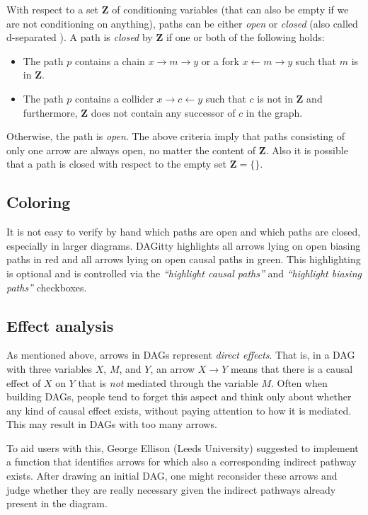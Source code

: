 \documentclass[a4paper]{article} %
\newcommand{\pp}{{\sc DAG}itty\xspace}
\newcommand{\action}[1]{\emph{``#1''}}
\begin{document}
With respect to a set $\mathbf{Z}$ of conditioning variables (that 
can also be empty if we are not conditioning on anything), 
paths can be either \emph{open} or \emph{closed}
(also called d-separated \cite{Pearl2009}). A path 
is \emph{closed} by $\mathbf{Z}$ if one or both of the following holds: 

\begin{itemize}
 \item The path $p$ contains a chain $x \rightarrow m \rightarrow y$ 
 	or a fork $x \leftarrow m \rightarrow y$ 
    such that $m$ is in $\mathbf{Z}$.
 \item The path $p$ contains a collider $x \rightarrow c \leftarrow y$ 
 	such that $c$ is not in $\mathbf{Z}$ and 
    furthermore, $\mathbf{Z}$ does not contain
    any successor of $c$ in the graph. 
\end{itemize}

Otherwise, the path is \emph{open}.
The above criteria imply that paths consisting of only one
arrow are always open, no matter the content of $\mathbf{Z}$. 
Also it is possible that a path is closed with respect
to the empty set $\mathbf{Z}=\{\}$.

\subsection{Coloring}

It is not easy to verify by hand which paths are open and
which paths are closed, especially in larger diagrams. 
\pp highlights all arrows lying on open 
biasing paths in red and all arrows lying on open
causal paths in green. This highlighting is optional 
and is controlled via 
the \action{highlight causal paths} and \action{highlight biasing paths}
checkboxes.

\subsection{Effect analysis}

As mentioned above, arrows in DAGs represent \emph{direct effects}. That is, in a DAG
with three variables $X$, $M$, and $Y$, an arrow $X \to Y$ means that there is a causal
effect of $X$ on $Y$ that is \emph{not} mediated through the variable $M$. 
Often when building DAGs, people tend to forget this aspect and think only about whether
any kind of causal effect exists, without paying attention to how it is mediated. This 
may result in DAGs with too many arrows. 

To aid users with this, George Ellison (Leeds University) suggested to implement a 
function that identifies arrows for which also a corresponding indirect pathway exists. 
After drawing an initial DAG, one might reconsider these arrows and judge whether they
are really necessary given the indirect pathways already present in the diagram.
\end{document}
